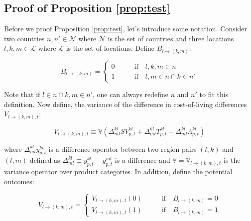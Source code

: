 \subsection{Proof of Proposition \ref{prop:test}}
Before we proof Proposition \ref{prop:test}, let's introduce some notation. Consider two countries $n,n' \in \mathcal{N}$ where $\mathcal{N}$ is the set of countries and three locations $l,k,m \in \mathcal{L}$ where $\mathcal{L}$ is the set of locations. Define $B_{l \rightarrow (k,m)}$:
\begin{linenomath*}
    \begin{equation*}
        B_{l \rightarrow (k,m)}
         = 
         \begin{cases}
            0 & \qquad \text{if} \quad l,k,m \in n \\
            1 & \qquad \text{if} \quad l,m \in n  \cap  k \in n' 
         \end{cases}
    \end{equation*}
\end{linenomath*}
Note that if $l \in n \cap k,m \in n'$, one can always redefine $n$ and $n'$ to fit this definition. Now define, the variance of the difference in cost-of-living differences $V_{l \rightarrow (k,m),t}$: 
\begin{linenomath*}
    \begin{equation*}
        V_{l \rightarrow (k,m),t} 
            \equiv \mathbb{V}
                \left(\Delta_{ml}^{kl}SV_{p,t}^{kl} + \Delta_{ml}^{kl}T_{p,t}^{kl} - \Delta_{ml}^{kl}\Lambda_{p,t}^{kl}\right)
    \end{equation*}
\end{linenomath*}
where $\Delta_{ml}^{kl} y_{p,t}^{kl}$ is a difference operator between two region pairs $(l,k)$ and $(l,m)$ defined as $\Delta_{ml}^{kl} \equiv y_{p,t}^{kl} - y_{p,t}^{ml}$ is a difference and $\mathbb{V} = \mathbb{V}_{l \rightarrow (k,m),t}$ is the variance operator over product categories. In addition, define the potential outcomes: 
\begin{linenomath*}
    \begin{equation*}
        V_{l \rightarrow (k,m),t} 
         = 
         \begin{cases}
            V_{l \rightarrow (k,m),t}(0) & \qquad \text{if} \quad B_{l \rightarrow (k,m)} = 0 \\
            V_{l \rightarrow (k,m),t}(1) & \qquad \text{if} \quad B_{l \rightarrow (k,m)} = 1
         \end{cases}
    \end{equation*}
\end{linenomath*}
